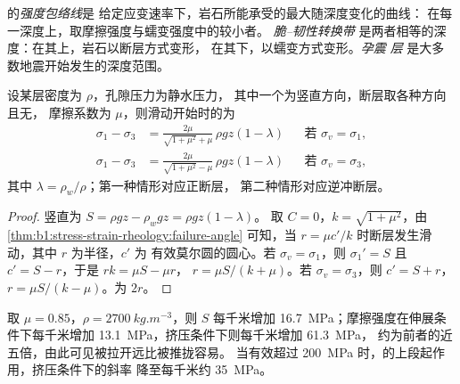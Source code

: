 \begin{definition}\label{def:b1:stress-strain-rheology:strength-envelope}
的\emph{强度包络线}是
给定应变速率下，岩石所能承受的最大随深度变化的曲线：
在每一深度上，取摩擦强度与蠕变强度中的较小者。
\emph{脆–韧性转换带}
是两者相等的深度：在其上，岩石以断层方式变形，
在其下，以蠕变方式变形。\emph{孕震
层}
是大多数地震开始发生的深度范围。
\end{definition}

\begin{proposition}[摩擦强度随深度的变化]\label{prop:b1:stress-strain-rheology:brittle-gradient}
设某层密度为 $\rho$，孔隙压力为静水压力，
其中一个为竖直方向，断层取各种方向且无，
摩擦系数为 $\mu$，则滑动开始时的为
\begin{align*}
  \sigma_1 - \sigma_3 &= \frac{2\mu}{\sqrt{1+\mu^2} + \mu}\,\rho g z(1-\lambda)
  && \text{若 $\sigma_v = \sigma_1$}, \\
  \sigma_1 - \sigma_3 &= \frac{2\mu}{\sqrt{1+\mu^2} - \mu}\,\rho g z(1-\lambda)
  && \text{若 $\sigma_v = \sigma_3$},
\end{align*}
其中 $\lambda = \rho_w/\rho$；第一种情形对应正断层，
第二种情形对应逆冲断层。
\end{proposition}

\begin{proof}
竖直为 $S = \rho g z - \rho_w g z = \rho g z(1-\lambda)$。
取 $C = 0$，$k = \sqrt{1+\mu^2}$，由\cref{thm:b1:stress-strain-rheology:failure-angle}
可知，当 $r = \mu c'/k$ 时断层发生滑动，其中 $r$ 为半径，$c'$ 为
有效莫尔圆的圆心。若 $\sigma_v = \sigma_1$，则
$\sigma_1' = S$ 且 $c' = S - r$，于是 $rk = \mu S - \mu r$，
$r = \mu S/(k+\mu)$。若 $\sigma_v = \sigma_3$，则 $c' = S + r$，
$r = \mu S/(k-\mu)$。为 $2r$。
\end{proof}

取 $\mu = 0.85$，$\rho = \qty{2700}{kg.m^{-3}}$，则 $S$ 每千米增加
\qty{16.7}{MPa}；摩擦强度在伸展条件下每千米增加
\qty{13.1}{MPa}，挤压条件下则每千米增加 \qty{61.3}{MPa}，
约为前者的近五倍，由此可见被拉开远比被推拢容易。
当有效超过
\qty{200}{MPa} 时，的上段起作用，挤压条件下的斜率
降至每千米约 \qty{35}{MPa}。

